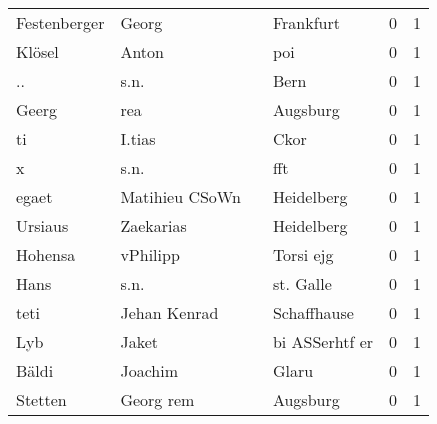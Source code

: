 \begin{tabular}{llllrr}
             Festenberger &                              Georg &             &                                   Frankfurt &          0 &         1 \\
                   Klösel &                              Anton &             &                                         poi &          0 &         1 \\
                       .. &                               s.n. &             &                                        Bern &          0 &         1 \\
                    Geerg &                                rea &             &                                    Augsburg &          0 &         1 \\
                       ti &                             I.tias &             &                                        Ckor &          0 &         1 \\
                        x &                               s.n. &             &                                         fft &          0 &         1 \\
                    egaet &                     Matihieu CSoWn &             &                                  Heidelberg &          0 &         1 \\
                  Ursiaus &                          Zaekarias &             &                                  Heidelberg &          0 &         1 \\
                  Hohensa &                           vPhilipp &             &                                   Torsi ejg &          0 &         1 \\
                     Hans &                               s.n. &             &                                   st. Galle &          0 &         1 \\
                     teti &                       Jehan Kenrad &             &                                 Schaffhause &          0 &         1 \\
                      Lyb &                              Jaket &             &                              bi ASSerhtf er &          0 &         1 \\
                    Bäldi &                            Joachim &             &                                       Glaru &          0 &         1 \\
                  Stetten &                          Georg rem &             &                                    Augsburg &          0 &         1 \\

\end{tabular}
